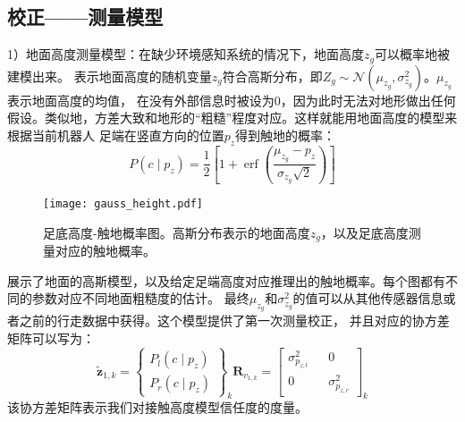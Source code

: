 \subsection{校正——测量模型}

1）地面高度测量模型：在缺少环境感知系统的情况下，地面高度$z_g$可以概率地被建模出来。
表示地面高度的随机变量$z_g$符合高斯分布，即$Z_g \sim \mathcal{N}\left(\mu_{z_g}, \sigma_{z_g}^2\right)$。$\mu_{z_g}$表示地面高度的均值，
在没有外部信息时被设为0，因为此时无法对地形做出任何假设。类似地，方差大致和地形的“粗糙”程度对应。这样就能用地面高度的模型来根据当前机器人
足端在竖直方向的位置$p_z$得到触地的概率：
\begin{equation}
    \label{equ:est_height_prob}
    P\left(c \mid p_z\right)=\frac{1}{2}\left[1+\operatorname{erf}\left(\frac{\mu_{z_g}-p_z}{\sigma_{z_g} \sqrt{2}}\right)\right]
\end{equation}
\begin{figure}[htbp]
    \centering
    \texttt{[image: gauss\_height.pdf]}
    \caption{\label{fig:gauss_height}足底高度-触地概率图。高斯分布表示的地面高度${{z}_{g}}$，以及足底高度测量对应的触地概率。}
\end{figure}
展示了地面的高斯模型，以及给定足端高度对应推理出的触地概率。每个图都有不同的参数对应不同地面粗糙度的估计。
最终$\mu_{z_g}$和$\sigma_{z_g}^2$的值可以从其他传感器信息或者之前的行走数据中获得。这个模型提供了第一次测量校正，
并且对应的协方差矩阵可以写为：
\begin{equation}
    \label{equ:est_height_noise}
    \tilde{\boldsymbol{z}}_{1, k}=\left\{\begin{array}{c}
        P_l\left(c \mid p_z\right) \\
        P_r\left(c \mid p_z\right)
        \end{array}\right\}_k \boldsymbol{R}_{v_{1, k}}=\left[\begin{array}{ccc}
        \sigma_{p_{z, l}}^2 & & 0 \\
        0 & & \sigma_{p_{z, r}}^2
        \end{array}\right]_k
\end{equation}
该协方差矩阵表示我们对接触高度模型信任度的度量。

